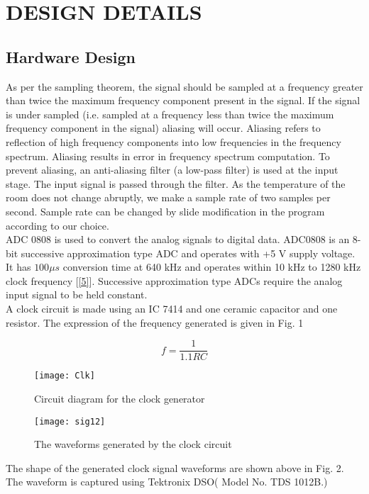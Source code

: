 \documentclass[10pt,a4paper]{article}
\begin{document}
\section{DESIGN DETAILS}
\subsection{Hardware Design}
As per the sampling theorem, the signal should be sampled at a frequency greater than twice the maximum frequency component present in the signal. If the signal is under sampled (i.e. sampled at a frequency less than twice the maximum frequency component in the signal) aliasing will occur. Aliasing refers to reflection of high frequency components into low frequencies in the frequency spectrum. Aliasing results in error in frequency spectrum computation. To prevent aliasing, an anti-aliasing filter (a low-pass filter) is used at the input stage. The input signal is passed through the filter. As the temperature of the room does not change abruptly, we make a sample rate of two samples per second. Sample rate can be changed by slide modification in the program according to our choice.\\

ADC 0808 is used to convert the analog signals to digital data. ADC0808 is an 8-bit successive approximation type ADC and operates with +5 V supply voltage. It has $100\mu s$ conversion time at 640 kHz and operates within 10 kHz to 1280 kHz clock frequency [\ref{5}]. Successive approximation type ADCs require the analog input signal to be held constant.\\

A clock circuit is made using an IC 7414 and one ceramic capacitor and one resistor. The expression of the frequency generated is given in Fig. 1
\begin{center}
\begin{equation}
f=\dfrac{1}{1.1RC}
\end{equation}
\end{center}
\begin{center}
\begin{figure}[!h]
\centering
\texttt{[image: Clk]}
\caption{Circuit diagram for the clock generator}
\end{figure}
\end{center}
\begin{figure}[!h]
\centering
\texttt{[image: sig12]}
\centering \caption{The waveforms generated by the clock circuit}
\end{figure}
The shape of the generated clock signal waveforms are shown above in Fig. 2. The waveform is captured using Tektronix DSO( Model No. TDS 1012B.)\\
\end{document}
